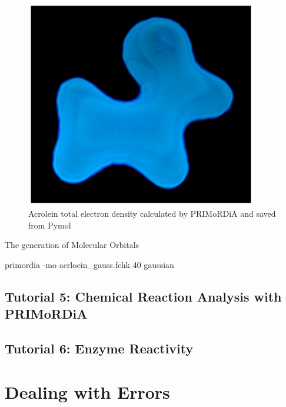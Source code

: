 \documentclass[a4paper,11pt]{refart}
\begin{document}
\begin{figure}[H]
	\includegraphics[width=4in]{images_material/figure2}
	\caption{Acrolein total electron density calculated by PRIMoRDiA and saved from Pymol }
	\label{fig2}
\end{figure} 

The generation of Molecular Orbitals 


\hspace*{-\leftmarginwidth}
\begin{minipage}{\fullwidth}
	\begin{commandshell}primordia -mo acrloein_gauss.fchk  40 gaussian\end{commandshell}
\end{minipage}


\subsection{Tutorial 5: Chemical Reaction Analysis with PRIMoRDiA }


\subsection{Tutorial 6: Enzyme Reactivity }


\section{Dealing with Errors}
\end{document}
